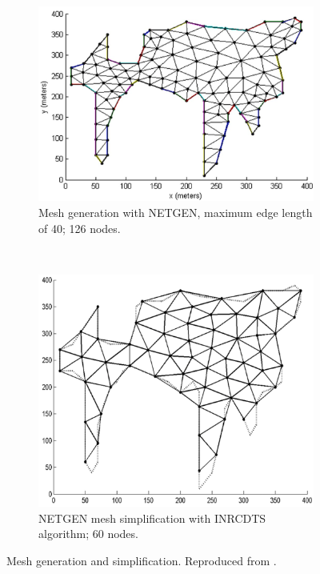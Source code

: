 \documentclass[authoryearcitations]{UoYCSproject}
\begin{document}
\begin{figure}
 \centering
    \begin{subfigure}[t]{.48\textwidth}
        \includegraphics[width=\textwidth]{figures/netgen.png}
        \caption{Mesh generation with NETGEN, maximum edge length of 40; 126 nodes.}
        \label{fig:netgen}
    \end{subfigure}
    ~
    \begin{subfigure}[t]{.48\textwidth}
        \includegraphics[width=\textwidth]{figures/netgen-inrcdts.png}
        \caption{NETGEN mesh simplification with INRCDTS algorithm; 60 nodes.}
        \label{fig:inrcdts}
    \end{subfigure}
 \caption[Mesh generation and simplification.]{Mesh generation and simplification. Reproduced from \citet{Derr2013}.}
 \label{fig:netgen-inrcdts}
\end{figure}
\end{document}
